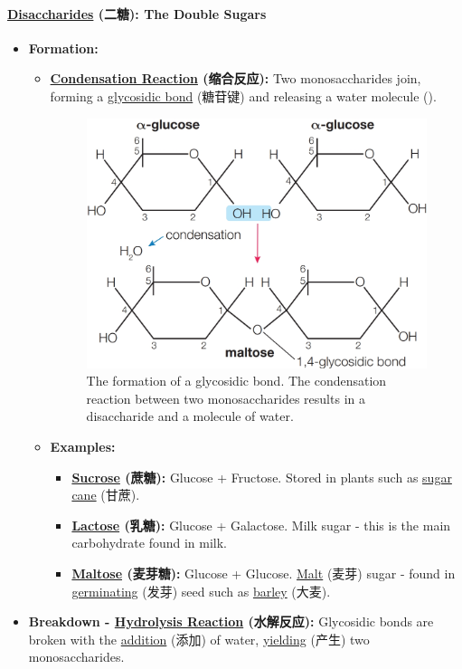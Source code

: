 \paragraph{\underline{Disaccharides} (二糖): The Double Sugars}
\begin{itemize}
    \item \textbf{Formation:}
    \begin{itemize}
        \item \textbf{\underline{Condensation Reaction} (缩合反应):} Two monosaccharides join, forming a \underline{glycosidic
        bond} (糖苷键) and releasing a water molecule ().
        \begin{figure}[H]
            \centering
            \includegraphics[scale=0.18]{Biology/1A/Images/1A-2-4.png}
            \caption{The formation of a glycosidic bond. The condensation reaction between two monosaccharides results in a
            disaccharide and a molecule of water.}
        \end{figure}
        \item \textbf{Examples:}
        \begin{itemize}
            \item \textbf{\underline{Sucrose} (蔗糖):} Glucose + Fructose. Stored in plants such as \underline{sugar cane} (甘蔗).
            \item \textbf{\underline{Lactose} (乳糖):} Glucose + Galactose. Milk sugar - this is the main carbohydrate found in
            milk.
            \item \textbf{\underline{Maltose} (麦芽糖):} Glucose + Glucose. \underline{Malt} (麦芽) sugar - found in
            \underline{germinating} (发芽) seed such as \underline{barley} (大麦).
        \end{itemize}
    \end{itemize}
    \item \textbf{Breakdown - \underline{Hydrolysis Reaction} (水解反应):} Glycosidic bonds are broken with the
    \underline{addition} (添加) of water, \underline{yielding} (产生) two monosaccharides.
\end{itemize}

